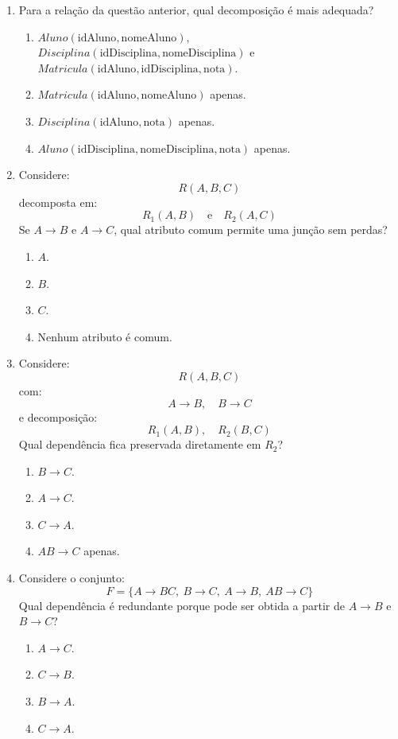\documentclass[12pt,a4paper]{article}
\begin{document}
\begin{enumerate}[resume,label=\textbf{Q\arabic*.}]
\item Para a relação da questão anterior, qual decomposição é mais adequada?

\begin{enumerate}[label=\alph*)]
    \item $Aluno(\text{idAluno}, \text{nomeAluno})$, $Disciplina(\text{idDisciplina}, \text{nomeDisciplina})$ e $Matricula(\text{idAluno}, \text{idDisciplina}, \text{nota})$.
    \item $Matricula(\text{idAluno}, \text{nomeAluno})$ apenas.
    \item $Disciplina(\text{idAluno}, \text{nota})$ apenas.
    \item $Aluno(\text{idDisciplina}, \text{nomeDisciplina}, \text{nota})$ apenas.
\end{enumerate}

\item Considere:
\[
R(A,B,C)
\]
decomposta em:
\[
R_1(A,B)\quad \text{e}\quad R_2(A,C)
\]
Se $A \rightarrow B$ e $A \rightarrow C$, qual atributo comum permite uma junção sem perdas?

\begin{enumerate}[label=\alph*)]
    \item $A$.
    \item $B$.
    \item $C$.
    \item Nenhum atributo é comum.
\end{enumerate}

\item Considere:
\[
R(A,B,C)
\]
com:
\[
A \rightarrow B,\quad B \rightarrow C
\]
e decomposição:
\[
R_1(A,B),\quad R_2(B,C)
\]
Qual dependência fica preservada diretamente em $R_2$?

\begin{enumerate}[label=\alph*)]
    \item $B \rightarrow C$.
    \item $A \rightarrow C$.
    \item $C \rightarrow A$.
    \item $AB \rightarrow C$ apenas.
\end{enumerate}

\item Considere o conjunto:
\[
F=\{A \rightarrow BC,\ B \rightarrow C,\ A \rightarrow B,\ AB \rightarrow C\}
\]
Qual dependência é redundante porque pode ser obtida a partir de $A \rightarrow B$ e $B \rightarrow C$?

\begin{enumerate}[label=\alph*)]
    \item $A \rightarrow C$.
    \item $C \rightarrow B$.
    \item $B \rightarrow A$.
    \item $C \rightarrow A$.
\end{enumerate}


\end{enumerate}
\end{document}
